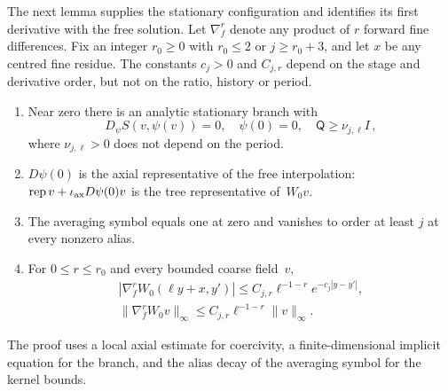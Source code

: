 The next lemma supplies the stationary configuration and identifies its first derivative with the free solution. Let $\nabla_f^r$ denote any product of $r$ forward fine differences. Fix an integer $r_0\ge0$ with $r_0\le2$ or $j\ge r_0+3$, and let $x$ be any centred fine residue. The constants $c_j>0$ and $C_{j,r}$ depend on the stage and derivative order, but not on the ratio, history or period.
\begin{lemma}\label{lem:B3}
\begin{enumerate}[label=(\roman*)]
\item Near zero there is an analytic stationary branch with
\begin{equation*}
D_\psi S(v,\psi(v))=0,\quad \psi(0)=0,\quad \mathsf Q\ge\nu_{j,\ell} I\,,
\end{equation*}
where $\nu_{j,\ell}>0$ does not depend on the period.
\item $D\psi(0)$ is the axial representative of the free interpolation: $\operatorname{rep}v+\iota_{\rm ax}D\psi(0)v$ is the tree representative of~$W_0v$.
\item The averaging symbol equals one at zero and vanishes to order at least $j$ at every nonzero alias.
\item For $0\le r\le r_0$ and every bounded coarse field~$v$,
\begin{gather*}
|\nabla_f^rW_0(\ell y+x,y')|\le C_{j,r}\ell^{-1-r}e^{-c_j|y-y'|},\\
\|\nabla_f^rW_0v\|_\infty\le C_{j,r}\ell^{-1-r}\|v\|_\infty.
\end{gather*}
\end{enumerate}
\end{lemma}
The proof uses a local axial estimate for coercivity, a finite-dimensional implicit equation for the branch, and the alias decay of the averaging symbol for the kernel bounds.
